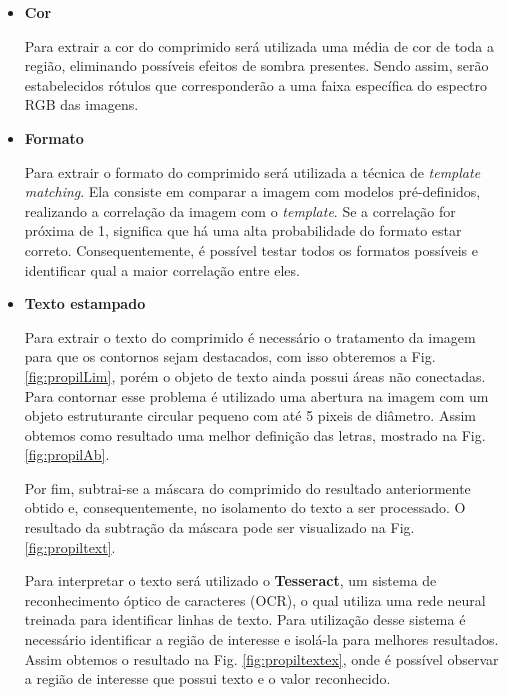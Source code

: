 \begin{itemize}
    \item \textbf{Cor}
    
    Para extrair a cor do comprimido será utilizada uma média de cor de toda a região, eliminando possíveis efeitos de sombra presentes. Sendo assim, serão estabelecidos rótulos que corresponderão a uma faixa específica do espectro RGB das imagens.
    
    \newpage
    \item \textbf{Formato}
    
    Para extrair o formato do comprimido será utilizada a técnica de \textit{template matching}. Ela consiste em comparar a imagem com modelos pré-definidos, realizando a correlação da imagem com o \textit{template}. Se a correlação for próxima de 1, significa que há uma alta probabilidade do formato estar correto. Consequentemente, é possível testar todos os formatos possíveis e identificar qual a maior correlação entre eles.
    
    \item \textbf{Texto estampado}
    
    Para extrair o texto do comprimido é necessário o tratamento da imagem para que os contornos sejam destacados, com isso obteremos a Fig. \ref{fig:propilLim}, porém o objeto de texto ainda possui áreas não conectadas. Para contornar esse problema é utilizado uma abertura na imagem com um objeto estruturante circular pequeno com até 5 pixeis de diâmetro. Assim obtemos como resultado uma melhor definição das letras, mostrado na Fig. \ref{fig:propilAb}.
    
    Por fim, subtrai-se a máscara do comprimido do resultado anteriormente obtido e, consequentemente, no isolamento do texto a ser processado. O resultado da subtração da máscara pode ser visualizado na Fig. \ref{fig:propiltext}.
    
    Para interpretar o texto será utilizado o \textbf{Tesseract}, um sistema de reconhecimento óptico de caracteres (OCR), o qual utiliza uma rede neural treinada para identificar linhas de texto. Para utilização desse sistema é necessário identificar a região de interesse e isolá-la para melhores resultados. Assim obtemos o resultado na Fig. \ref{fig:propiltextex}, onde é possível observar a região de interesse que possui texto e o valor reconhecido.
    

\end{itemize}
